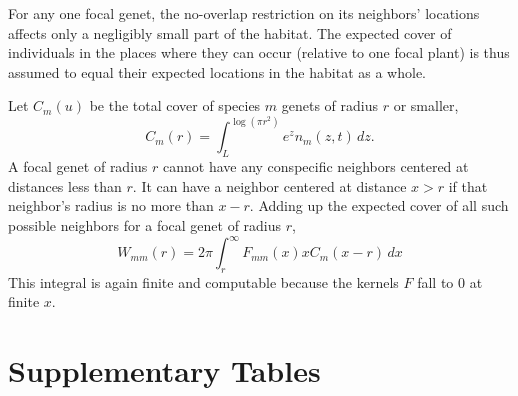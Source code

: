 \documentclass[11pt]{article}
\begin{document}
For any one focal genet, the no-overlap restriction on its neighbors' locations affects 
only a negligibly small part of the habitat. The expected cover of individuals in the places
where they can occur (relative to one focal plant) is thus assumed to equal their expected locations
in the habitat as a whole. 
 
Let $C_m(u)$ be the total cover of species $m$ genets of radius $r$ or smaller, 
\begin{equation}
C_m(r) = \int_L^{\log(\pi r^2)}{\! \! \! e^z n_m(z,t) \, dz} .
\label{eqn:cm}
\end{equation}
A focal genet of radius $r$ cannot have any conspecific neighbors centered 
at distances less than $r$. It can have a neighbor centered at distance $x>r$ if that neighbor's
radius is no more than $x-r$. Adding up the expected cover of all such possible neighbors
for a focal genet of radius $r$,    
\begin{equation}
W_{mm}(r) = 2 \pi \int_r^{\infty}F_{mm}(x) x C_m(x-r) \, dx
\label{eqn:wbarmr} 
\end{equation}
This integral is again finite and computable because the kernels $F$ fall to 0 at finite $x$. 

\clearpage 
\newpage  

\renewcommand{\theequation}{B-\arabic{equation}}
\renewcommand{\thetable}{B-\arabic{table}}
\renewcommand{\thefigure}{B-\arabic{figure}}

\section{Supplementary Tables} 
\end{document}
